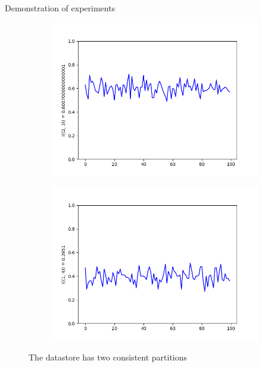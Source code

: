 \documentclass[aspectratio=43]{beamer}
\begin{document}
\begin{frame}{Demonstration of experiments}
\begin{figure}
\begin{subfigure}{0.3\linewidth}
\centering\includegraphics[width=\linewidth]{images/2-3-consistent-partitions-probability.png}\hfill
\end{subfigure}
\begin{subfigure}{0.3\linewidth}
\centering\includegraphics[width=\linewidth]{images/1-4-consistent-partitions-probability.png}
\end{subfigure}
\caption{The datastore has two consistent partitions}
\end{figure}


\end{frame}
\end{document}
